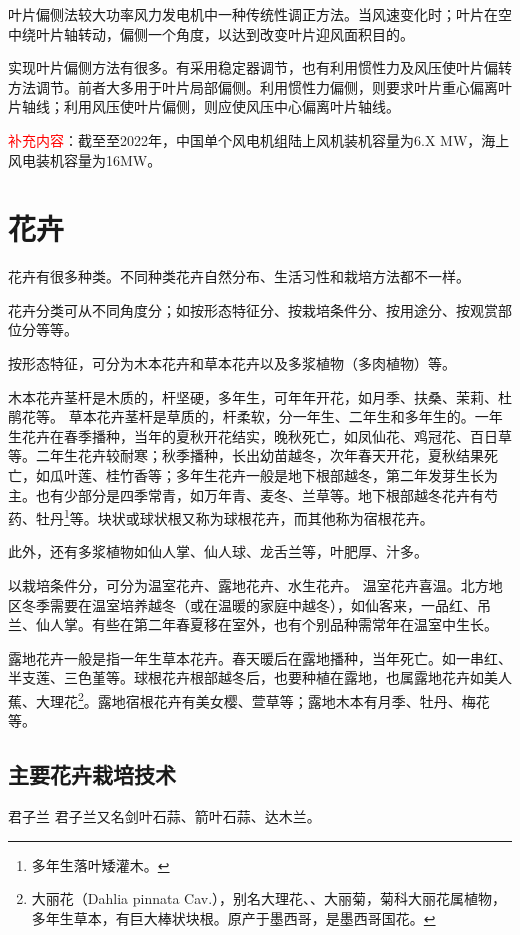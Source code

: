 \documentclass{ctexbook}
\begin{document}
叶片偏侧法较大功率风力发电机中一种传统性调正方法。当风速变化时；叶片在空中绕叶片轴转动，偏侧一个角度，以达到改变叶片迎风面积目的。

实现叶片偏侧方法有很多。有采用稳定器调节，也有利用惯性力及风压使叶片偏转方法调节。前者大多用于叶片局部偏侧。利用惯性力偏侧，则要求叶片重心偏离叶片轴线；利用风压使叶片偏侧，则应使风压中心偏离叶片轴线。

\textcolor{red}{补充内容}：截至至2022年，中国单个风电机组陆上风机装机容量为6.X MW，海上风电装机容量为16MW。
\chapter{花卉}
花卉有很多种类。不同种类花卉自然分布、生活习性和栽培方法都不一样。

花卉分类可从不同角度分；如按形态特征分、按栽培条件分、按用途分、按观赏部位分等等。

按形态特征，可分为木本花卉和草本花卉以及多浆植物（多肉植物）等。

木本花卉茎杆是木质的，杆坚硬，多年生，可年年开花，如月季、扶桑、茉莉、杜鹃花等。
草本花卉茎杆是草质的，杆柔软，分一年生、二年生和多年生的。一年生花卉在春季播种，当年的夏秋开花结实，晚秋死亡，如凤仙花、鸡冠花、百日草等。二年生花卉较耐寒；秋季播种，长出幼苗越冬，次年春天开花，夏秋结果死亡，如瓜叶莲、桂竹香等；多年生花卉一般是地下根部越冬，第二年发芽生长为主。也有少部分是四季常青，如万年青、麦冬、兰草等。地下根部越冬花卉有芍药、牡丹\footnote{多年生落叶矮灌木。}等。块状或球状根又称为球根花卉，而其他称为宿根花卉。

此外，还有多浆植物如仙人掌、仙人球、龙舌兰等，叶肥厚、汁多。

以栽培条件分，可分为温室花卉、露地花卉、水生花卉。
温室花卉喜温。北方地区冬季需要在温室培养越冬（或在温暖的家庭中越冬），如仙客来，一品红、吊兰、仙人掌。有些在第二年春夏移在室外，也有个别品种需常年在温室中生长。

露地花卉一般是指一年生草本花卉。春天暖后在露地播种，当年死亡。如一串红、半支莲、三色堇等。球根花卉根部越冬后，也要种植在露地，也属露地花卉如美人蕉、大理花\footnote{大丽花（Dahlia pinnata Cav.），别名大理花、、大丽菊，菊科大丽花属植物，多年生草本，有巨大棒状块根。原产于墨西哥，是墨西哥国花。}。露地宿根花卉有美女樱、萱草等；露地木本有月季、牡丹、梅花等。

\section{主要花卉栽培技术}
君子兰
君子兰又名剑叶石蒜、箭叶石蒜、达木兰。
\end{document}
